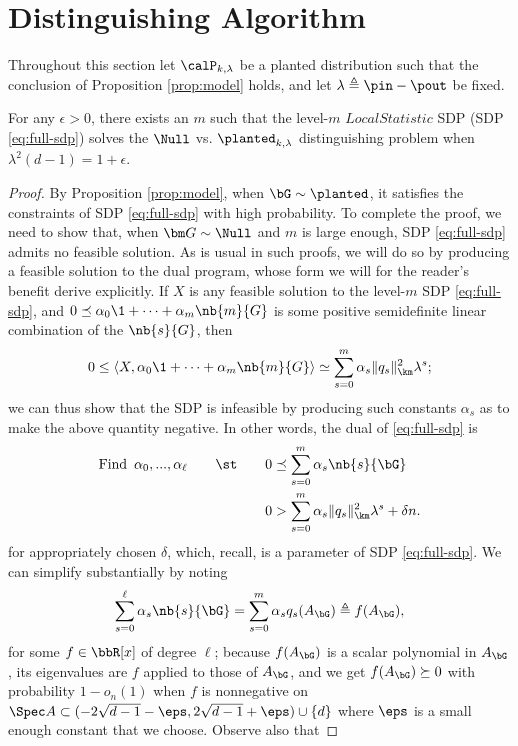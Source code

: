 \section{Distinguishing Algorithm}    \label{sec:algo}

Throughout this section let $\calP_{k,\lambda}$ be a planted distribution such that the conclusion of Proposition \ref{prop:model} holds, and let $\lambda \triangleq \pin - \pout$ be fixed.
\begin{theorem} \label{thm:main-upper-bound}
    For any $\epsilon > 0$, there exists an $m$ such that the level-$m$ $LocalStatistic$ SDP (SDP \eqref{eq:full-sdp}) solves the $\Null$ vs. $\planted_{k,\lambda}$ distinguishing problem when $\lambda^2(d-1)=1+\epsilon$.
\end{theorem}
\begin{proof}
By Proposition \ref{prop:model}, when $\bG\sim\planted$, it satisfies the constraints of SDP \eqref{eq:full-sdp} with high probability.  To complete the proof, we need to show that, when $\bm G \sim \Null$ and $m$ is large enough, SDP \eqref{eq:full-sdp} admits no feasible solution. As is usual in such proofs, we will do so by producing a feasible solution to the dual program, whose form we will for the reader's benefit derive explicitly. If $X$ is any feasible solution to the level-$m$ SDP \eqref{eq:full-sdp}, and $0 \preceq \alpha_0\1 + \cdots + \alpha_m \nb{m}{G}$ is some positive semidefinite linear combination of the $\nb{s}{G}$, then
$$
    0 \le \langle X,\alpha_0\1 + \cdots + \alpha_m \nb{m}{G}\rangle \simeq \sum_{s= 0}^m \alpha_s \|q_s\|^2_{\km}\lambda^s;
$$
we can thus show that the SDP is infeasible by producing such constants $\alpha_s$ as to make the above quantity negative. In other words, the dual of \eqref{eq:full-sdp} is
\begin{align} \label{eq:full-dual}
	\text{Find}\,\,\, \alpha_0,...,\alpha_\ell \qquad \st \qquad
		0 &\preceq\sum_{s=0}^m \alpha_s \nb{s}{\bG} \\
		0 &> \sum_{s=0}^m \alpha_s \|q_s\|^2_{\km} \lambda^s + \delta n. \nonumber
\end{align}
for appropriately chosen $\delta$, which, recall, is a parameter of SDP \eqref{eq:full-sdp}.  We can simplify substantially by noting
\[
	\sum_{s=0}^\ell \alpha_s \nb{s}{\bG} = \sum_{s=0}^m \alpha_s q_s(A_{\bG}) \triangleq f(A_{\bG}),
\]
for some $f\in \bbR[x]$ of degree $\ell$; because $f(A_{\bG})$ is a scalar polynomial in $A_{\bG}$, its eigenvalues are $f$ applied to those of $A_{\bG}$, and we get $f(A_{\bG}) \succeq 0$ with probability $1-o_n(1)$ when $f$ is nonnegative on $\Spec A \subset (-2\sqrt{d-1} - \eps,2\sqrt{d-1} + \eps)\cup\{d\}$ where $\eps$ is a small enough constant that we choose. Observe also that

\end{proof}
